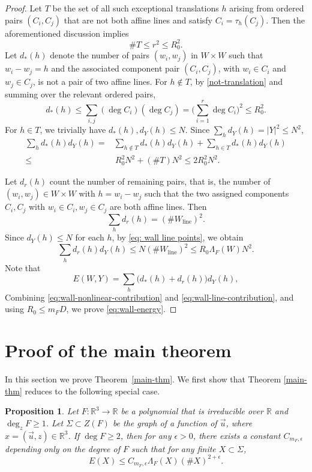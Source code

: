 \documentclass{amsart}%
\numberwithin{equation}{section}
\newtheorem{proposition}[theorem]{Proposition}
\newcommand{\e}{\epsilon}
\newcommand{\ZR}{\mathbb{R}}
\newcommand{\1}{\mathbbm{1}}
\begin{document}
\begin{proof}
Let $T$ be the set of all such exceptional translations $h$ arising from ordered pairs $(C_i,C_j)$ that are not both affine lines and satisfy $C_i=\tau_h(C_j)$.
Then the aforementioned discussion implies
\[
    \#T\leq r^2\leq R_0^2.
\]
Let $d_*(h)$ denote the number of pairs $(w_i,w_j)$ in $W\times W$ such that $w_i-w_j=h$ and the associated component pair $(C_i,C_j)$, with $w_i\in C_i$ and $w_j\in C_j$, is not a pair of two affine lines.
For $h\notin T$, by \eqref{not-translation} and summing over the relevant ordered pairs, 
\[
    d_*(h)\leq \sum_{i,j}(\deg C_i)(\deg C_j)=\Big(\sum_{i=1}^r\deg C_i\Big)^2\leq R_0^2.
\]
For $h\in T$, we trivially have $d_*(h),d_{Y}(h)\leq N$. Since $\sum_hd_{Y}(h)=|Y|^2\leq N^2$, 
\begin{align}
\nonumber
    \sum_h d_*(h)d_{Y}(h)=&\sum_{h\not\in T} d_*(h)d_{Y}(h)+\sum_{h \in T} d_*(h)d_{Y}(h)\\  \label{eq:wall-nonlinear-contribution}
    \leq &\, R_0^2N^2+(\#T)N^2\leq 2R_0^2N^2.
\end{align}

Let $d_{r}(h)$ count the number of remaining pairs, that is, the number of $(w_i,w_j)\in W\times W$ with $h=w_i-w_j$ such that the two assigned components $C_i, C_j$ with $w_i\in C_i, w_j\in C_j$ are both affine lines.
Then
\[
    \sum_h d_{r}(h)=(\#W_{\mathrm{line}})^2.
\]
Since $d_{Y}(h)\leq N$ for each $h$, by \eqref{eq: wall line points}, we obtain
\begin{equation}
\label{eq:wall-line-contribution}
    \sum_h d_{r}(h)d_{Y}(h) \leq N(\#W_{\mathrm{line}})^2
    \leq R_0\Lambda_{ F}(W) N^2.
\end{equation}
Note that
\[
    E(W,Y)=\sum_h\bigl(d_*(h)+d_{r}(h)\bigr)d_{Y}(h),
\]
Combining \eqref{eq:wall-nonlinear-contribution} and
\eqref{eq:wall-line-contribution}, and using $R_0\leq m_FD$, we prove \eqref{eq:wall-energy}.
\end{proof}

\bigskip



\section{Proof of the main theorem} 
\label{proof-section}

In this section we prove Theorem~\ref{main-thm}.
We first show that Theorem \ref{main-thm} reduces to the following special case.

\begin{proposition}
\label{main-prop}
Let $F:\ZR^3\to\ZR$ be a polynomial that is irreducible over $\ZR$ and  $\deg_z F\ge 1$.
Let $\Sigma\subset Z(F)$ be the graph of a function of $\vec{u}$, where $x=(\vec{u},z)\in\ZR^3$.
If $\deg F\geq2$, then for any $\e>0$, there exists a constant $C_{m_F,\e}$ depending only on the degree of $F$ such that for any finite $X\subset \Sigma$,
\begin{equation}
\label{prop-esti}
    E(X)\leq C_{m_F,\e}\Lambda_{F}(X)(\#X)^{2+\e}.
\end{equation}
\end{proposition}
\end{document}
